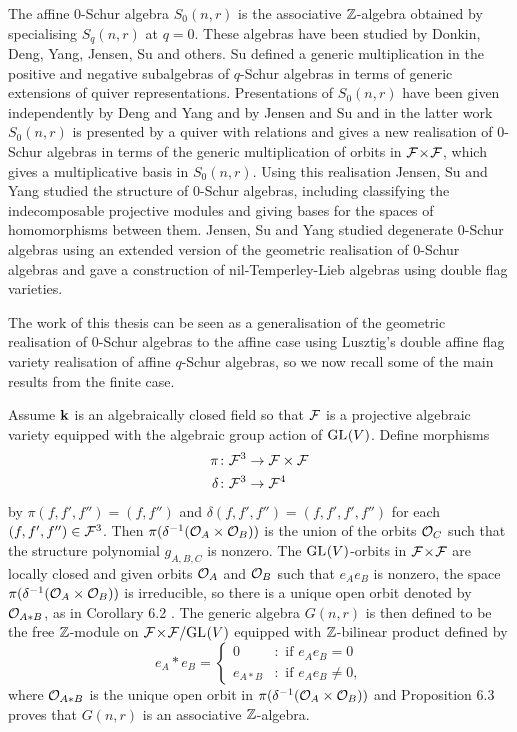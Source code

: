 \documentclass[a4paper, 11pt, twoside]{report}
\begin{document}
The affine $0$-Schur algebra $S_0(n,r)$ is the associative $\mathbb{Z}$-algebra obtained by specialising $S_q(n,r)$ at $q=0$. These algebras have been studied by Donkin, Deng, Yang, Jensen, Su and others. Su \cite{su10} defined a generic multiplication in the positive and negative subalgebras of $q$-Schur algebras in terms of generic extensions of quiver representations. Presentations of $S_0(n,r)$ have been given independently by Deng and Yang \cite{deng12} and by Jensen and Su \cite{su15} and in the latter work $S_0(n,r)$ is presented by a quiver with relations and gives a new realisation of $0$-Schur algebras in terms of the generic multiplication of orbits in ${\mathcal{F}\!\times\!\mathcal{F}}$, which gives a multiplicative basis in $S_0(n,r)$. Using this realisation Jensen, Su and Yang \cite{su16} studied the structure of $0$-Schur algebras, including classifying the indecomposable projective modules and giving bases for the spaces of homomorphisms between them. Jensen, Su and Yang \cite{su20} studied degenerate $0$-Schur algebras using an extended version of the geometric realisation of $0$-Schur algebras and gave a construction of nil-Temperley-Lieb algebras using double flag varieties.

The work of this thesis can be seen as a generalisation of the geometric realisation of $0$-Schur algebras \cite{su15} to the affine case using Lusztig's double affine flag variety realisation of affine $q$-Schur algebras, so we now recall some of the main results from the finite case.

Assume $\mathbf{k}$ is an algebraically closed field so that $\mathcal{F}$ is a projective algebraic variety equipped with the algebraic group action of $\operatorname{GL}_{}(V)$. Define morphisms
\begin{align*}
\pi\colon\mathcal{F}^3 &\to\mathcal{F}\times\mathcal{F}\\
\delta\colon\mathcal{F}^3 &\to\mathcal{F}^4
\end{align*}
by $\pi(f,f',f'')=(f,f'')$ and $\delta(f,f',f'')=(f,f',f',f'')$ for each $(f,f',f'')\in\mathcal{F}^3$. Then $\pi(\delta^{-1}(\mathcal{O}_{A}\times\mathcal{O}_{B}))$ is the union of the orbits $\mathcal{O}_{C}$ such that the structure polynomial $g_{A,B,C}$ is nonzero. The $\operatorname{GL}_{}(V)$-orbits in ${\mathcal{F}\!\times\!\mathcal{F}}$ are locally closed and given orbits $\mathcal{O}_{A}$ and $\mathcal{O}_{B}$ such that $e_Ae_B$ is nonzero, the space $\pi(\delta^{-1}(\mathcal{O}_{A}\times\mathcal{O}_{B}))$ is irreducible, so there is a unique open orbit denoted by $\mathcal{O}_{A\ast B}$, as in Corollary 6.2 \cite{su15}. The generic algebra $G(n,r)$ is then defined to be the free $\mathbb{Z}$-module on ${\mathcal{F}\!\times\!\mathcal{F}}/{\operatorname{GL}_{}(V)}$ equipped with $\mathbb{Z}$-bilinear product defined by
\begin{equation*}
e_A\ast e_B = \begin{cases}
0 &:\text{ if } e_Ae_B=0\\
e_{A\ast B} &:\text { if } e_Ae_B\neq 0,
\end{cases}
\end{equation*}
where $\mathcal{O}_{A\ast B}$ is the unique open orbit in $\pi(\delta^{-1}(\mathcal{O}_{A}\times\mathcal{O}_{B}))$ and Proposition 6.3 \cite{su15} proves that $G(n,r)$ is an associative $\mathbb{Z}$-algebra.
\end{document}
